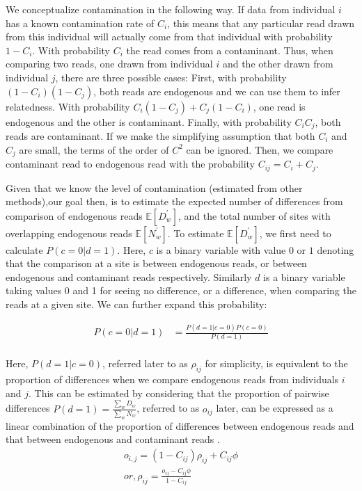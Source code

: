 \documentclass[12pt, letterpaper]{article}
\begin{document}
We conceptualize contamination in the following way. If data from individual $i$ has a known contamination rate of $C_i$, this means that any particular read drawn from this individual will actually come from that individual with probability $1-C_i$. With probability $C_i$ the read comes from a contaminant. Thus, when comparing two reads, one drawn from individual $i$ and the other drawn from individual $j$, there are three possible cases: First, with probability $(1-C_i)(1-C_j)$, both reads are endogenous and we can use them to infer relatedness. With probability $C_i(1-C_j) + C_j(1-C_i)$, one read is endogenous and the other is contaminant. Finally, with probability $C_iC_j$, both reads are contaminant. If we make the simplifying assumption that both $C_i$ and $C_j$ are small, the terms of the order of $C^2$ can be ignored. Then, we compare contaminant read to endogenous read with the probability $C_{ij} = C_i + C_j$.

Given that we know the level of contamination (estimated from other methods),our goal then, is to estimate the expected number of differences from comparison of endogenous reads $\mathbb{E}[D_w^{'}]$, and the total number of sites with overlapping endogenous reads $\mathbb{E}[N_w^{'}]$. To estimate $\mathbb{E}[D_w^{'}]$, we first need to calculate $P(c=0|d=1)$. Here, $c$ is a binary variable with value $0$ or $1$ denoting that the comparison at a site is between endogenous reads, or between endogenous and contaminant reads respectively. Similarly $d$ is a binary variable taking values 0 and 1 for seeing no difference, or a difference, when comparing the reads at a given site. We can further expand this probability:

\begin{align}\label{eq:12a}
    P(c=0|d=1) &= \frac{P(d=1|c=0)P(c=0)}{P(d=1)} \nonumber\\
\end{align}

Here, $P(d=1|c=0)$, referred later to as $\rho_{ij}$ for simplicity, is equivalent to the proportion of differences when we compare endogenous reads from individuals $i$ and $j$. This can be estimated by considering that the proportion of pairwise differences $P(d=1) =\frac{\sum_w D_w}{\sum_w N_w}$, referred to as $o_{ij}$ later, can be expressed as a linear combination of the proportion of differences between endogenous reads and that between endogenous and contaminant reads \cite{peyregne_present-day_2020}. 
\begin{align}\label{eq:13}
    o_{i,j} = (1-C_{ij}) \rho_{ij} + C_{ij} \phi \nonumber\\
    or, \rho_{ij} = \frac{o_{ij} - C_{ij} \phi} {1 - C_{ij}}
\end{align}
\end{document}
